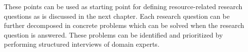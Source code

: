 These points can be used as starting point for defining resource-related research questions as is discussed in the next chapter. Each research question can be further decomposed in concrete problems which can be solved when the research question is answered. These problems can be identified and prioritized by performing structured interviews of domain experts.








